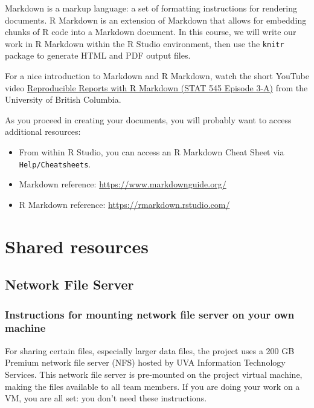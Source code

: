 \documentclass[
]{book}
\begin{document}
Markdown is a markup language: a set of formatting instructions for rendering documents. R Markdown is an extension of Markdown that allows for embedding chunks of R code into a Markdown document. In this course, we will write our work in R Markdown within the R Studio environment, then use the \texttt{knitr} package to generate HTML and PDF output files.

For a nice introduction to Markdown and R Markdown, watch the short YouTube video \href{https://www.youtube.com/watch?v=ZzDSkBgt9xQ}{Reproducible Reports with R Markdown (STAT 545 Episode 3-A)} from the University of British Columbia.

As you proceed in creating your documents, you will probably want to access additional resources:

\begin{itemize}
\item
  From within R Studio, you can access an R Markdown Cheat Sheet via \texttt{Help/Cheatsheets}.
\item
  Markdown reference: \url{https://www.markdownguide.org/}
\item
  R Markdown reference: \url{https://rmarkdown.rstudio.com/}
\end{itemize}

\hypertarget{shared-resources}{%
\chapter{Shared resources}\label{shared-resources}}

\hypertarget{network-file-server}{%
\section{Network File Server}\label{network-file-server}}

\hypertarget{instructions-for-mounting-network-file-server-on-your-own-machine}{%
\subsection{Instructions for mounting network file server on your own machine}\label{instructions-for-mounting-network-file-server-on-your-own-machine}}

For sharing certain files, especially larger data files, the project uses a 200 GB Premium network file server (NFS) hosted by UVA Information Technology Services. This network file server is pre-mounted on the project virtual machine, making the files available to all team members. If you are doing your work on a VM, you are all set: you don't need these instructions.
\end{document}
